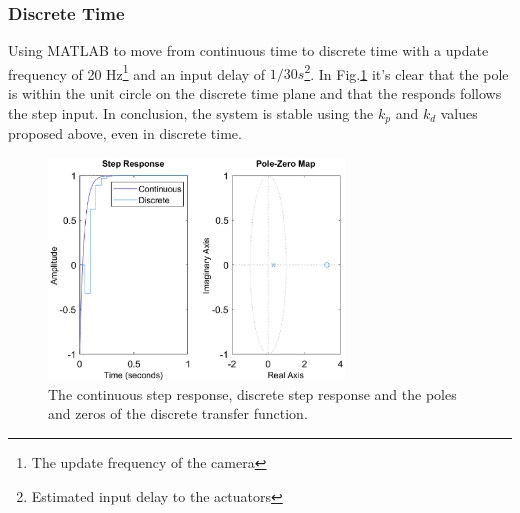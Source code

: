 \subsubsection{Discrete Time}
Using MATLAB to move from continuous time to discrete time with a update frequency of 20 Hz\footnote{The update frequency of the camera} and an input delay of $1/30s$\footnote{Estimated input delay to the actuators}. In Fig.\ref{fig:stepD} it's clear that the pole is within the unit circle on the discrete time plane and that the responds follows the step input. In conclusion, the system is stable using the $k_p$ and $k_d$ values proposed above, even in discrete time.

\begin{figure}[H]
    \centering
    \includegraphics[width= 0.7\textwidth]{img/closed_loop_step_D.eps}
    \caption{The continuous step response, discrete step response and the poles and zeros of the discrete transfer function.}
    \label{fig:stepD}
\end{figure}
